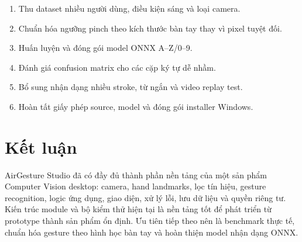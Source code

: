 \documentclass[12pt,a4paper]{article}
\begin{document}
\begin{enumerate}
  \item Thu dataset nhiều người dùng, điều kiện sáng và loại camera.
  \item Chuẩn hóa ngưỡng pinch theo kích thước bàn tay thay vì pixel tuyệt đối.
  \item Huấn luyện và đóng gói model ONNX A--Z/0--9.
  \item Đánh giá confusion matrix cho các cặp ký tự dễ nhầm.
  \item Bổ sung nhận dạng nhiều stroke, từ ngắn và video replay test.
  \item Hoàn tất giấy phép source, model và đóng gói installer Windows.
\end{enumerate}

\section{Kết luận}

AirGesture Studio đã có đầy đủ thành phần nền tảng của một sản phẩm Computer
Vision desktop: camera, hand landmarks, lọc tín hiệu, gesture recognition,
logic ứng dụng, giao diện, xử lý lỗi, lưu dữ liệu và quyền riêng tư. Kiến trúc
module và bộ kiểm thử hiện tại là nền tảng tốt để phát triển từ prototype thành
sản phẩm ổn định. Ưu tiên tiếp theo nên là benchmark thực tế, chuẩn hóa gesture
theo hình học bàn tay và hoàn thiện model nhận dạng ONNX.
\end{document}
